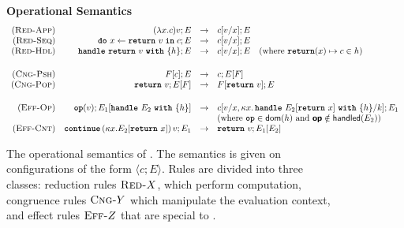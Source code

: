 \begin{figure}[ht]
\begin{eff-desc}
{\noindent\textbf{Operational Semantics}}
  {\footnotesize
\[
  \begin{array}{rrcl}
  \reductionRule{App} & \transition{\effconfiguration{(\function{x}{c})v}{E}}{\effconfiguration{c[v/x]}{E}}\\
  \reductionRule{Seq} & \transition{\effconfiguration{\bind{x}{\return{v}}{c}}{E}}{\effconfiguration{c[v/x]}{E}}\\
  \reductionRule{Hdl} & \transition{\effconfiguration{\handleWith{\return{v}}{h}}{E}}{\effconfiguration{c[v/x]}{E}} \quad (\text{where $\returnHandler{x}{c} \in h$)}\\
  \vspace{1mm} \\ 
  \congruenceRule{Psh} & \transition{\effconfiguration{F[c]}{E}}{\effconfiguration{c}{E[F]}} \\
  \congruenceRule{Pop} & \transition{\effconfiguration{\return{v}}{E[F]}}{\effconfiguration{F[\return{v}]}{E}}\\
  \vspace{1mm} \\
  \effectRule{Op} & \transition{\effconfiguration{\op{v}}{E_1[\handleWith{E_2}{h}]}}\effconfiguration{c[v/x, \kappa x. \, \handleWith{E_2[\return{x}]}{h} / k]}{E_1}\\
  &&& \text{(where $\textbf{\texttt{op}} \in \textsf{dom}(h)$ and $\textbf{\textsf{op}} \notin \textsf{handled}(E_2)$)}\\
  \effectRule{Cnt} & \transition{\effconfiguration{\continue{(\kappa x. E_2[\return{x}])}{v}}{E_1}}{\effconfiguration{\return{v}}{E_1[E_2]}}

\end{array}
\]
  }
\end{eff-desc}
\caption{The operational semantics of \efflang{}. The semantics is given on configurations of the form $\langle c; E \rangle$. Rules are divided into three classes: reduction rules $\textsc{Red-}X$, which perform computation, congruence rules $\textsc{Cng-}Y$ which manipulate the evaluation context, and effect rules $\textsc{Eff-}Z$ that are special to \efflang{}.}
\label{fig:efflang-opsem}
\end{figure}

